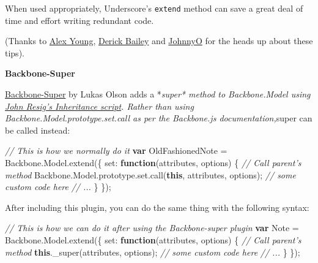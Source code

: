 \documentclass[9pt]{book}
\newenvironment{Shaded}{}{}
\newcommand{\KeywordTok}[1]{\textcolor[rgb]{0.00,0.44,0.13}{\textbf{{#1}}}}
\newcommand{\DataTypeTok}[1]{\textcolor[rgb]{0.56,0.13,0.00}{{#1}}}
\newcommand{\CommentTok}[1]{\textcolor[rgb]{0.38,0.63,0.69}{\textit{{#1}}}}
\newcommand{\OtherTok}[1]{\textcolor[rgb]{0.00,0.44,0.13}{{#1}}}
\newcommand{\FunctionTok}[1]{\textcolor[rgb]{0.02,0.16,0.49}{{#1}}}
\newcommand{\NormalTok}[1]{{#1}}
\begin{document}
When used appropriately, Underscore's \texttt{extend} method can save a
great deal of time and effort writing redundant code.

(Thanks to \href{http://dailyjs.com}{Alex Young},
\href{http://stackoverflow.com/users/93448/derick-bailey}{Derick Bailey}
and \href{http://stackoverflow.com/users/188740/johnnyo}{JohnnyO} for
the heads up about these tips).

\textbf{Backbone-Super}

\href{https://github.com/lukasolson/Backbone-Super}{Backbone-Super} by
Lukas Olson adds a *\emph{super* method to \emph{Backbone.Model} using
\href{http://ejohn.org/blog/simple-javascript-inheritance/}{John Resig's
Inheritance script}. Rather than using Backbone.Model.prototype.set.call
as per the Backbone.js documentation,}super can be called instead:

\begin{Shaded}
\begin{Highlighting}[]
\CommentTok{// This is how we normally do it}
\KeywordTok{var} \NormalTok{OldFashionedNote = }\OtherTok{Backbone}\NormalTok{.}\OtherTok{Model}\NormalTok{.}\FunctionTok{extend}\NormalTok{(\{}
  \DataTypeTok{set}\NormalTok{: }\KeywordTok{function}\NormalTok{(attributes, options) \{}
    \CommentTok{// Call parent's method}
    \OtherTok{Backbone}\NormalTok{.}\OtherTok{Model}\NormalTok{.}\OtherTok{prototype}\NormalTok{.}\OtherTok{set}\NormalTok{.}\FunctionTok{call}\NormalTok{(}\KeywordTok{this}\NormalTok{, attributes, options);}
    \CommentTok{// some custom code here}
    \CommentTok{// ...}
  \NormalTok{\}}
\NormalTok{\});}
\end{Highlighting}
\end{Shaded}

After including this plugin, you can do the same thing with the
following syntax:

\begin{Shaded}
\begin{Highlighting}[]
\CommentTok{// This is how we can do it after using the Backbone-super plugin}
\KeywordTok{var} \NormalTok{Note = }\OtherTok{Backbone}\NormalTok{.}\OtherTok{Model}\NormalTok{.}\FunctionTok{extend}\NormalTok{(\{}
  \DataTypeTok{set}\NormalTok{: }\KeywordTok{function}\NormalTok{(attributes, options) \{}
    \CommentTok{// Call parent's method}
    \KeywordTok{this}\NormalTok{.}\FunctionTok{_super}\NormalTok{(attributes, options);}
    \CommentTok{// some custom code here}
    \CommentTok{// ...}
  \NormalTok{\}}
\NormalTok{\});}
\end{Highlighting}
\end{Shaded}
\end{document}
